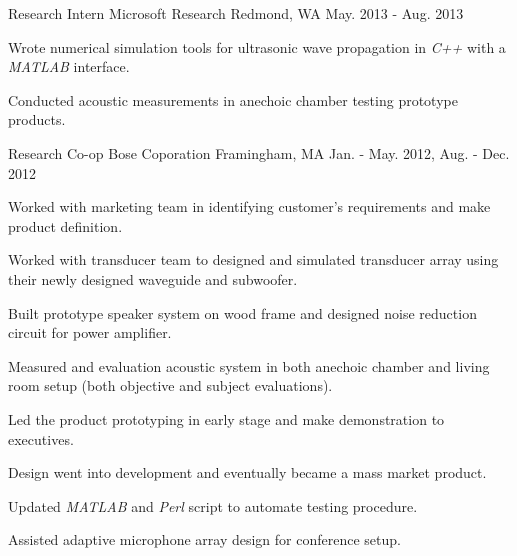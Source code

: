 \begin{cventries}
  \cventry
    {Research Intern} %
    {Microsoft Research} %
    {Redmond, WA} %
    {May. 2013 - Aug. 2013} %
    {
      \begin{cvitems} %
        \item {Wrote numerical simulation tools for ultrasonic wave propagation in \textit{C++} with a \textit{MATLAB} interface.}
        \item {Conducted acoustic measurements in anechoic chamber testing prototype products.}
      \end{cvitems}
    }

  \cventry
    {Research Co-op} %
    {Bose Coporation} %
    {Framingham, MA} %
    {Jan. - May. 2012, Aug. - Dec. 2012} %
    {
      \begin{cvitems} %
        \item {Worked with marketing team in identifying customer's requirements and make product definition.}
        \item {Worked with transducer team to designed and simulated transducer array using their newly designed waveguide and subwoofer.}
        \item {Built prototype speaker system on wood frame and designed noise reduction circuit for power amplifier.}
        \item {Measured and evaluation acoustic system in both anechoic chamber and living room setup (both objective and subject evaluations).}
        \item {Led the product prototyping in early stage and make demonstration to executives.}
        \item {Design went into development and eventually became a mass market product.}
        \item {Updated \textit{MATLAB} and \textit{Perl} script to automate testing procedure.}
        \item {Assisted adaptive microphone array design for conference setup.}
      \end{cvitems}
    }

\end{cventries}
